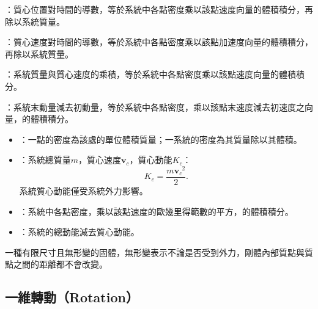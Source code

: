 \documentclass[a4paper,12pt]{article}
\begin{document}
\item{}：質心位置對時間的導數，等於系統中各點密度乘以該點速度向量的體積積分，再除以系統質量。
\item{}：質心速度對時間的導數，等於系統中各點密度乘以該點加速度向量的體積積分，再除以系統質量。
\item{}：系統質量與質心速度的乘積，等於系統中各點密度乘以該點速度向量的體積積分。
\item{}：系統末動量減去初動量，等於系統中各點密度，乘以該點末速度減去初速度之向量，的體積積分。
\eit
{}
\begin{itemize}
\item{}：一點的密度為該處的單位體積質量；一系統的密度為其質量除以其體積。
\item{}：系統總質量$m$，質心速度$\mathbf{v}_c$，質心動能$K_c$：
\[K_c=\frac{m\mathbf{v}_c^{\phantom{c}2}}{2}.\]
系統質心動能僅受系統外力影響。
\item{}：系統中各點密度，乘以該點速度的歐幾里得範數的平方，的體積積分。
\item{}：系統的總動能減去質心動能。
\end{itemize}
一種有限尺寸且無形變的固體，無形變表示不論是否受到外力，剛體內部質點與質點之間的距離都不會改變。
\subsection{一維轉動（Rotation）}
\end{document}
